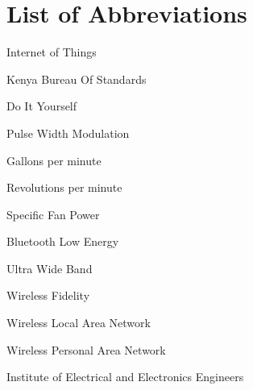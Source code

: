 \linespread{1.0}
\setlength{\parskip}{0.1em}
\section*{List of Abbreviations}

\begin{acronym}
  {Internet of Things}
\end{acronym}
\begin{acronym}
  {Kenya Bureau Of Standards}
\end{acronym}
\begin{acronym}
  {Do  It  Yourself}
\end{acronym}
\begin{acronym}
  {Pulse Width Modulation}
\end{acronym}
\begin{acronym}
  {Gallons per minute}
\end{acronym}
\begin{acronym}
  {Revolutions per minute}
\end{acronym}
\begin{acronym}
  {Specific Fan Power}
\end{acronym}
\begin{acronym}
  {Bluetooth Low Energy}
\end{acronym}
\begin{acronym}
  {Ultra Wide Band}
\end{acronym}
\begin{acronym}
\end{acronym}
\begin{acronym}
  {Wireless Fidelity}
\end{acronym}
\begin{acronym}
  {Wireless Local Area Network}
\end{acronym}
\begin{acronym}
  {Wireless Personal Area Network}
\end{acronym}
\begin{acronym}
  {Institute of Electrical and Electronics Engineers}
\end{acronym}
\begin{acronym}
\end{acronym}
\begin{acronym}
\end{acronym}
